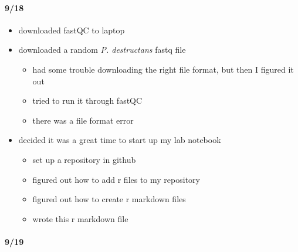 \documentclass[
]{article}
\providecommand{\tightlist}{%
  \setlength{\itemsep}{0pt}\setlength{\parskip}{0pt}}
\begin{document}
\hypertarget{section-2}{%
\paragraph{9/18}\label{section-2}}

\begin{itemize}
\tightlist
\item
  downloaded fastQC to laptop
\item
  downloaded a random \emph{P. destructans} fastq file

  \begin{itemize}
  \tightlist
  \item
    had some trouble downloading the right file format, but then I
    figured it out
  \item
    tried to run it through fastQC
  \item
    there was a file format error
  \end{itemize}
\item
  decided it was a great time to start up my lab notebook

  \begin{itemize}
  \tightlist
  \item
    set up a repository in github
  \item
    figured out how to add r files to my repository
  \item
    figured out how to create r markdown files
  \item
    wrote this r markdown file
  \end{itemize}
\end{itemize}

\hypertarget{section-3}{%
\paragraph{9/19}\label{section-3}}
\end{document}
